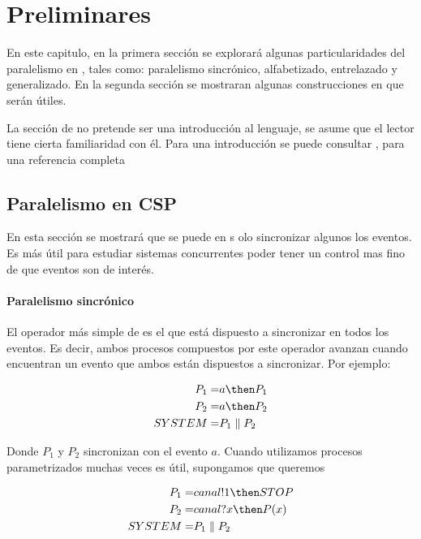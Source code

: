 \chapter{Preliminares}

En este capitulo, en la primera sección se explorará algunas particularidades del paralelismo en \CSP, tales como: paralelismo sincrónico, alfabetizado, entrelazado y generalizado. En la segunda sección se mostraran algunas construcciones en \CSPm que serán útiles. 

La sección de \CSP no pretende ser una introducción al lenguaje, se asume que el lector tiene cierta familiaridad con él. Para una introducción se puede consultar \cite{Cristia:CSP}, para una referencia completa \cite{Roscoe:1997:TPC:550448}

\section{Paralelismo en CSP}

En esta sección se mostrará que se puede en \CSP s	olo sincronizar algunos los eventos. Es más útil para estudiar sistemas concurrentes poder tener un control mas fino de que eventos son de interés. 

\subsubsection*{Paralelismo sincrónico}

El operador más simple de \CSP es el que está dispuesto a sincronizar en todos los eventos. Es decir, ambos procesos compuestos por este operador avanzan cuando encuentran un evento que ambos están dispuestos a sincronizar. Por ejemplo:

\begin{align*}
P_1 =& a \then P_1\\
P_2 =& a \then P_2 \\
SYSTEM =& P_1 \parallel P_2
\end{align*}

Donde $P_1$ y $P_2$ sincronizan con el evento $a$. Cuando utilizamos procesos parametrizados muchas veces es útil, supongamos que queremos 

\begin{align*}
P_1 =& canal!1 \then STOP \\
P_2 =& canal?x \then P(x) \\
SYSTEM =& P_1 \parallel P_2 \\
\end{align*}

